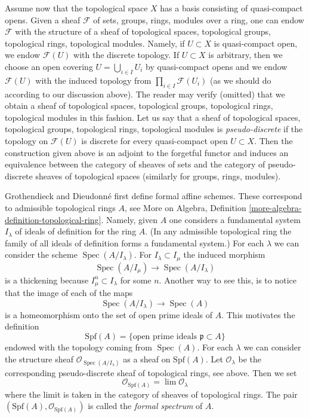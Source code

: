 \documentclass{stacks-project}
\theoremstyle{plain}
\theoremstyle{definition}
\theoremstyle{remark}
\numberwithin{equation}{subsection}
\def\lim{\mathop{\mathrm{lim}}\nolimits}
\def\Spec{\mathop{\mathrm{Spec}}}
\begin{document}
\medskip\noindent
Assume now that the topological space $X$ has a basis consisting
of quasi-compact opens. Given a sheaf $\mathcal{F}$ of sets, groups,
rings, modules over a ring, one can endow $\mathcal{F}$ with
the structure of a sheaf of topological spaces, topological groups,
topological rings, topological modules.
Namely, if $U \subset X$ is quasi-compact open,
we endow $\mathcal{F}(U)$ with the discrete topology. If $U \subset X$
is arbitrary, then we choose an open covering $U = \bigcup_{i \in I} U_i$
by quasi-compact opens and we endow $\mathcal{F}(U)$ with
the induced topology from $\prod_{i \in I} \mathcal{F}(U_i)$
(as we should do according to our discussion above).
The reader may verify (omitted) that we obtain a sheaf of topological spaces,
topological groups, topological rings, topological modules in this fashion.
Let us say that a sheaf of topological spaces, topological groups,
topological rings, topological modules is
{\it pseudo-discrete} if the topology on $\mathcal{F}(U)$ is
discrete for every quasi-compact open $U \subset X$. Then
the construction given above is an adjoint to the forgetful functor
and induces an equivalence between the category of sheaves
of sets and the category of pseudo-discrete sheaves of topological spaces
(similarly for groups, rings, modules).

\medskip\noindent
Grothendieck and Dieudonn\'e first define formal affine schemes.
These correspond to admissible topological rings $A$, see
More on Algebra, Definition \ref{more-algebra-definition-topological-ring}.
Namely, given $A$ one considers a fundamental system $I_\lambda$ of ideals
of definition for the ring $A$. (In any admissible topological ring
the family of all ideals of definition forms a fundamental system.)
For each $\lambda$ we can consider the
scheme $\Spec(A/I_\lambda)$. For $I_\lambda \subset I_\mu$ the induced
morphism
$$
\Spec(A/I_\mu) \to \Spec(A/I_\lambda)
$$
is a thickening because $I_\mu^n \subset I_\lambda$ for some $n$.
Another way to see this, is to notice that the image of each of the
maps
$$
\Spec(A/I_\lambda) \to \Spec(A)
$$
is a homeomorphism onto the set of open prime ideals of $A$.
This motivates the definition
$$
\text{Spf}(A) = \{\text{open prime ideals }\mathfrak p \subset A\}
$$
endowed with the topology coming from $\Spec(A)$. For each $\lambda$
we can consider the structure sheaf $\mathcal{O}_{\Spec(A/I_\lambda)}$
as a sheaf on $\text{Spf}(A)$. Let $\mathcal{O}_\lambda$ be the corresponding
pseudo-discrete sheaf of topological rings, see above.
Then we set
$$
\mathcal{O}_{\text{Spf}(A)} = \lim \mathcal{O}_\lambda
$$
where the limit is taken in the category of sheaves of topological rings.
The pair $(\text{Spf}(A), \mathcal{O}_{\text{Spf}(A)})$ is called the
{\it formal spectrum} of $A$.
\end{document}

